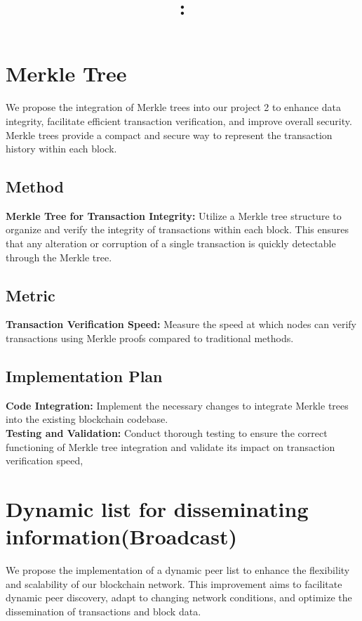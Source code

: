 \documentclass{article}
\title{\vspace{-1.5in}\textmd{\bf \Class: \Title}\\ \normalsize}
\date{}
\begin{document}
	\begin{spacing}{1.1}
		\maketitle \thispagestyle{empty}
\section{Merkle Tree}
	We propose the integration of Merkle trees into our project 2 to enhance data integrity, facilitate efficient transaction verification, and improve overall security. Merkle trees provide a compact and secure way to represent the transaction history within each block.
\subsection{Method}
	\textbf{Merkle Tree for Transaction Integrity:} Utilize a Merkle tree structure to organize and verify the integrity of transactions within each block. This ensures that any alteration or corruption of a single transaction is quickly detectable through the Merkle tree.
\subsection{Metric}
	\textbf{Transaction Verification Speed:} Measure the speed at which nodes can verify transactions using Merkle proofs compared to traditional methods.
\subsection{Implementation Plan}
	\textbf{Code Integration:} Implement the necessary changes to integrate Merkle trees into the existing blockchain codebase.\\
	\textbf{Testing and Validation:} Conduct thorough testing to ensure the correct functioning of Merkle tree integration and validate its impact on transaction verification speed,

\section{Dynamic list for disseminating information(Broadcast)}
	We propose the implementation of a dynamic peer list to enhance the flexibility and scalability of our blockchain network. This improvement aims to facilitate dynamic peer discovery, adapt to changing network conditions, and optimize the dissemination of transactions and block data.

\end{spacing}
\end{document}
